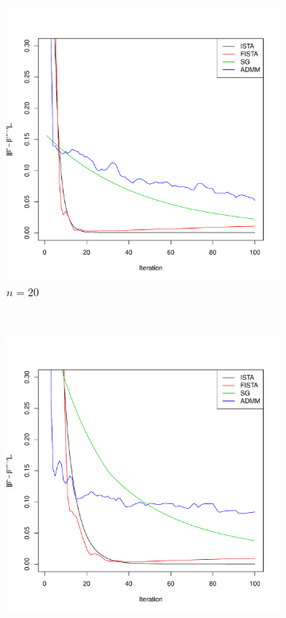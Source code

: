 \documentclass[12pt, leqno]{article}
\theoremstyle{remark}
\begin{document}
\begin{figure}[H]
  \centering
    \begin{subfigure}[b]{0.4\textwidth}
        \includegraphics[width=\textwidth]{20cvgc.pdf}
        \caption{$n=20$}
        \label{fig:20}
    \end{subfigure}
~
    \begin{subfigure}[b]{0.4\textwidth}
        \includegraphics[width=\textwidth]{50cvgc.pdf}

\end{subfigure}
\end{figure}
\end{document}
